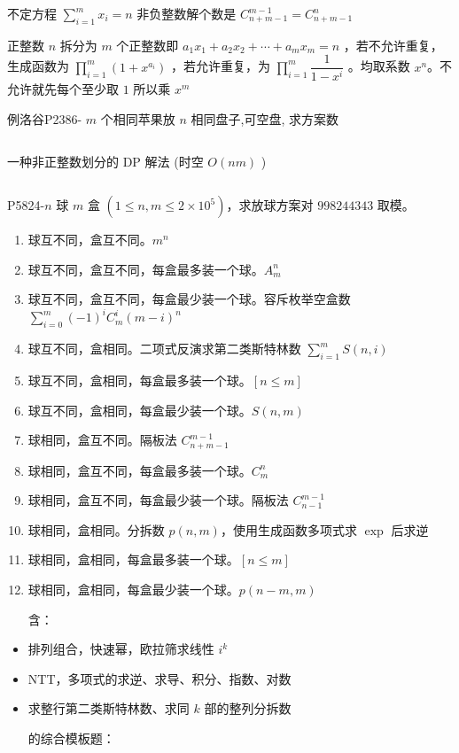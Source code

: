 \documentclass[twocolumn,10pt]{ctexart}
\begin{document}
不定方程 $\sum_{i=1}^mx_i=n$ 非负整数解个数是 $C_{n+m-1}^{m-1}=C_{n+m-1}^n$

正整数 $n$ 拆分为 $m$ 个正整数即 $a_1x_1+a_2x_2+\cdots+a_mx_m=n$ ，若不允许重复，生成函数为 $\prod_{i=1}^m(1+x^{a_i})$ ，若允许重复，为 $\prod_{i=1}^m\dfrac1{1-x^i}$ 。均取系数 $x^n$。不允许就先每个至少取 $1$ 所以乘 $x^m$

\begin{notebox}
例洛谷P2386- $m$ 个相同苹果放 $n$ 相同盘子,可空盘, 求方案数
\end{notebox}

\inputminted{cpp}{code/ext_002.cpp}

一种非正整数划分的 DP 解法 (时空 $O(nm)$ )

\inputminted{cpp}{code/p2386_ball_and_box_dp.cpp}

\begin{notebox}
P5824-$n$ 球 $m$ 盒 $(1\le n,m\le2\times 10^5)$，求放球方案对 $998244343$ 取模。
\end{notebox}

\begin{enumerate}
\item 球互不同，盒互不同。$m^n$
\item 球互不同，盒互不同，每盒最多装一个球。$A_m^n$
\item 球互不同，盒互不同，每盒最少装一个球。容斥枚举空盒数 $\sum_{i=0}^m(-1)^iC_m^i(m-i)^n$
\item 球互不同，盒相同。二项式反演求第二类斯特林数 $\sum_{i=1}^m S(n,i)$
\item 球互不同，盒相同，每盒最多装一个球。$[n\le m]$
\item 球互不同，盒相同，每盒最少装一个球。$S(n,m)$
\item 球相同，盒互不同。隔板法 $C_{n+m-1}^{m-1}$
\item 球相同，盒互不同，每盒最多装一个球。$C_m^n$
\item 球相同，盒互不同，每盒最少装一个球。隔板法 $C_{n-1}^{m-1}$
\item 球相同，盒相同。分拆数 $p(n,m)$，使用生成函数多项式求 $\exp$ 后求逆
\item 球相同，盒相同，每盒最多装一个球。$[n\le m]$
\item 球相同，盒相同，每盒最少装一个球。$p(n-m,m)$

含：
\end{enumerate}

\begin{itemize}
\item 排列组合，快速幂，欧拉筛求线性 $i^k$
\item NTT，多项式的求逆、求导、积分、指数、对数
\item 求整行第二类斯特林数、求同 $k$ 部的整列分拆数

的综合模板题：
\end{itemize}
\end{document}
